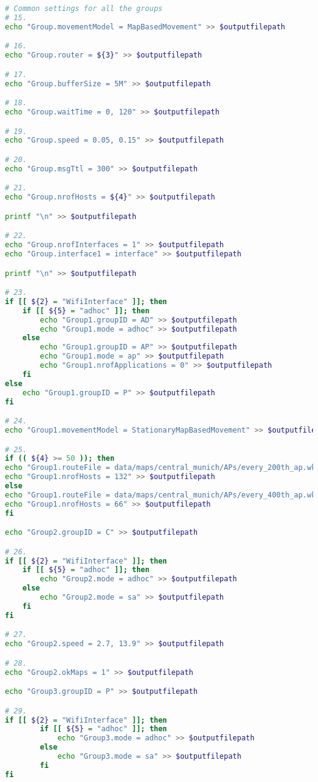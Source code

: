 \begin{lstlisting}[language=bash]
# Common settings for all the groups
# 15.
echo "Group.movementModel = MapBasedMovement" >> $outputfilepath

# 16.
echo "Group.router = ${3}" >> $outputfilepath

# 17.
echo "Group.bufferSize = 5M" >> $outputfilepath

# 18.
echo "Group.waitTime = 0, 120" >> $outputfilepath

# 19.
echo "Group.speed = 0.05, 0.15" >> $outputfilepath

# 20.
echo "Group.msgTtl = 300" >> $outputfilepath

# 21.
echo "Group.nrofHosts = ${4}" >> $outputfilepath

printf "\n" >> $outputfilepath

# 22.
echo "Group.nrofInterfaces = 1" >> $outputfilepath
echo "Group.interface1 = interface" >> $outputfilepath

printf "\n" >> $outputfilepath

# 23.
if [[ ${2} = "WifiInterface" ]]; then
	if [[ ${5} = "adhoc" ]]; then
		echo "Group1.groupID = AD" >> $outputfilepath
		echo "Group1.mode = adhoc" >> $outputfilepath
	else
		echo "Group1.groupID = AP" >> $outputfilepath
		echo "Group1.mode = ap" >> $outputfilepath
		echo "Group1.nrofApplications = 0" >> $outputfilepath
	fi
else
	echo "Group1.groupID = P" >> $outputfilepath
fi

# 24.
echo "Group1.movementModel = StationaryMapBasedMovement" >> $outputfilepath

# 25.
if (( ${4} >= 50 )); then
echo "Group1.routeFile = data/maps/central_munich/APs/every_200th_ap.wkt" >> $outputfilepath
echo "Group1.nrofHosts = 132" >> $outputfilepath
else
echo "Group1.routeFile = data/maps/central_munich/APs/every_400th_ap.wkt" >> $outputfilepath
echo "Group1.nrofHosts = 66" >> $outputfilepath
fi

echo "Group2.groupID = C" >> $outputfilepath

# 26.
if [[ ${2} = "WifiInterface" ]]; then
	if [[ ${5} = "adhoc" ]]; then
		echo "Group2.mode = adhoc" >> $outputfilepath
	else
		echo "Group2.mode = sa" >> $outputfilepath
	fi
fi

# 27.
echo "Group2.speed = 2.7, 13.9" >> $outputfilepath

# 28.
echo "Group2.okMaps = 1" >> $outputfilepath

echo "Group3.groupID = P" >> $outputfilepath

# 29.
if [[ ${2} = "WifiInterface" ]]; then
		if [[ ${5} = "adhoc" ]]; then
			echo "Group3.mode = adhoc" >> $outputfilepath
		else
			echo "Group3.mode = sa" >> $outputfilepath
		fi
fi


\end{lstlisting}
